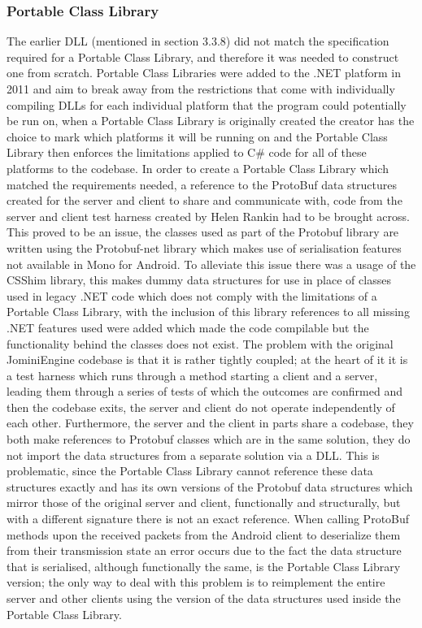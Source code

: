 \documentclass{article}
\begin{document}
\subsubsection{Portable Class Library}
The earlier DLL (mentioned in section 3.3.8) did not match the specification required for a Portable Class Library, and therefore it was needed to construct one from scratch. Portable Class Libraries were added to the .NET platform in 2011 and aim to break away from the restrictions that come with individually compiling DLLs for each individual platform that the program could potentially be run on, when a Portable Class Library is originally created the creator has the choice to mark which platforms it will be running on and the Portable Class Library then enforces the limitations applied to C\# code for all of these platforms to the codebase. In order to create a Portable Class Library which matched the requirements needed, a reference to the ProtoBuf data structures created for the server and client to share and communicate with, code from the server and client test harness created by Helen Rankin had to be brought across. This proved to be an issue, the classes used as part of the Protobuf library are written using the Protobuf-net library which makes use of serialisation features not available in Mono for Android. To alleviate this issue there was a usage of the CSShim library\cite{CSShim}, this makes dummy data structures for use in place of classes used in legacy .NET code which does not comply with the limitations of a Portable Class Library, with the inclusion of this library references to all missing .NET features used were added which made the code compilable but the functionality behind the classes does not exist. The problem with the original JominiEngine codebase is that it is rather tightly coupled; at the heart of it it is a test harness which runs through a method starting a client and a server, leading them through a series of tests of which the outcomes are confirmed and then the codebase exits, the server and client do not operate independently of each other. Furthermore, the server and the client in parts share a codebase, they both make references to Protobuf classes which are in the same solution, they do not import the data structures from a separate solution via a DLL. This is problematic, since the Portable Class Library cannot reference these data structures exactly and has its own versions of the Protobuf data structures which mirror those of the original server and client, functionally and structurally, but with a different signature there is not an exact reference. When calling ProtoBuf methods upon the received packets from the Android client to deserialize them from their transmission state an error occurs due to the fact the data structure that is serialised, although functionally the same, is the Portable Class Library version; the only way to deal with this problem is to reimplement the entire server and other clients using the version of the data structures used inside the Portable Class Library.
\end{document}
